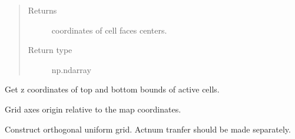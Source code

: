 \documentclass[letterpaper,10pt,english]{sphinxmanual}
\begin{document}
\begin{fulllineitems}
\begin{fulllineitems}
\begin{quote}
\begin{description}
\item[{Returns}] \leavevmode
coordinates of cell faces centers.

\item[{Return type}] \leavevmode
np.ndarray

\end{description}\end{quote}

\end{fulllineitems}


\begin{fulllineitems}
\label{\detokenize{api/grids:geology.src.CornerPointGrid.minimal_active_bounds}}
Get z coordinates of top and bottom bounds of active cells.

\end{fulllineitems}


\begin{fulllineitems}
\label{\detokenize{api/grids:geology.src.CornerPointGrid.origin}}
Grid axes origin relative to the map coordinates.

\end{fulllineitems}


\begin{fulllineitems}
\label{\detokenize{api/grids:geology.src.CornerPointGrid.orthogonalize}}
Construct orthogonal uniform grid. Actnum tranfer should be made separately.

\end{fulllineitems}



\end{fulllineitems}
\end{document}
